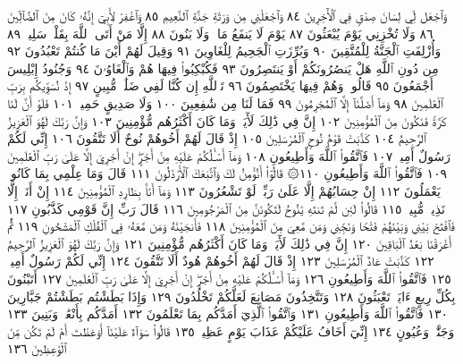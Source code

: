 وَٱجْعَل لِّي لِسَانَ صِدْقࣲ فِي ٱلْأٓخِرِينَ ٨٤ وَٱجْعَلْنِي مِن وَرَثَةِ جَنَّةِ
ٱلنَّعِيمِ ٨٥ وَٱغْفِرْ لِأَبِيٓ إِنَّهُۥ كَانَ مِنَ ٱلضَّآلِّينَ ٨٦ وَلَا تُخْزِنِي يَوْمَ
يُبْعَثُونَ ٨٧ يَوْمَ لَا يَنفَعُ مَالࣱ وَلَا بَنُونَ ٨٨ إِلَّا مَنْ أَتَى ٱللَّهَ بِقَلْبࣲ
سَلِيمࣲ ٨٩ وَأُزْلِفَتِ ٱلْجَنَّةُ لِلْمُتَّقِينَ ٩٠ وَبُرِّزَتِ ٱلْجَحِيمُ
لِلْغَاوِينَ ٩١ وَقِيلَ لَهُمْ أَيْنَ مَا كُنتُمْ تَعْبُدُونَ ٩٢ مِن دُونِ ٱللَّهِ هَلْ
يَنصُرُونَكُمْ أَوْ يَنتَصِرُونَ ٩٣ فَكُبْكِبُوا۟ فِيهَا هُمْ وَٱلْغَاوُۥنَ ٩٤ وَجُنُودُ
إِبْلِيسَ أَجْمَعُونَ ٩٥ قَالُوا۟ وَهُمْ فِيهَا يَخْتَصِمُونَ ٩٦ تَٱللَّهِ إِن كُنَّا لَفِي
ضَلَٰلࣲ مُّبِينٍ ٩٧ إِذْ نُسَوِّيكُم بِرَبِّ ٱلْعَٰلَمِينَ ٩٨ وَمَآ أَضَلَّنَآ إِلَّا
ٱلْمُجْرِمُونَ ٩٩ فَمَا لَنَا مِن شَٰفِعِينَ ١٠٠ وَلَا صَدِيقٍ حَمِيمࣲ ١٠١ فَلَوْ
أَنَّ لَنَا كَرَّةࣰ فَنَكُونَ مِنَ ٱلْمُؤْمِنِينَ ١٠٢ إِنَّ فِي ذَٰلِكَ لَأٓيَةࣰۖ وَمَا كَانَ
أَكْثَرُهُم مُّؤْمِنِينَ ١٠٣ وَإِنَّ رَبَّكَ لَهُوَ ٱلْعَزِيزُ ٱلرَّحِيمُ ١٠٤ كَذَّبَتْ
قَوْمُ نُوحٍ ٱلْمُرْسَلِينَ ١٠٥ إِذْ قَالَ لَهُمْ أَخُوهُمْ نُوحٌ أَلَا تَتَّقُونَ ١٠٦
إِنِّي لَكُمْ رَسُولٌ أَمِينࣱ ١٠٧ فَٱتَّقُوا۟ ٱللَّهَ وَأَطِيعُونِ ١٠٨ وَمَآ أَسْـَٔلُكُمْ
عَلَيْهِ مِنْ أَجْرٍۖ إِنْ أَجْرِيَ إِلَّا عَلَىٰ رَبِّ ٱلْعَٰلَمِينَ ١٠٩ فَٱتَّقُوا۟ ٱللَّهَ
وَأَطِيعُونِ ١١٠۞ قَالُوٓا۟ أَنُؤْمِنُ لَكَ وَٱتَّبَعَكَ ٱلْأَرْذَلُونَ ١١١
قَالَ وَمَا عِلْمِي بِمَا كَانُوا۟ يَعْمَلُونَ ١١٢ إِنْ حِسَابُهُمْ إِلَّا عَلَىٰ رَبِّيۖ
لَوْ تَشْعُرُونَ ١١٣ وَمَآ أَنَا۠ بِطَارِدِ ٱلْمُؤْمِنِينَ ١١٤ إِنْ أَنَا۠ إِلَّا نَذِيرࣱ
مُّبِينࣱ ١١٥ قَالُوا۟ لَئِن لَّمْ تَنتَهِ يَٰنُوحُ لَتَكُونَنَّ مِنَ ٱلْمَرْجُومِينَ ١١٦ قَالَ رَبِّ
إِنَّ قَوْمِي كَذَّبُونِ ١١٧ فَٱفْتَحْ بَيْنِي وَبَيْنَهُمْ فَتْحࣰا وَنَجِّنِي وَمَن مَّعِيَ
مِنَ ٱلْمُؤْمِنِينَ ١١٨ فَأَنجَيْنَٰهُ وَمَن مَّعَهُۥ فِي ٱلْفُلْكِ ٱلْمَشْحُونِ ١١٩
ثُمَّ أَغْرَقْنَا بَعْدُ ٱلْبَاقِينَ ١٢٠ إِنَّ فِي ذَٰلِكَ لَأٓيَةࣰۖ وَمَا كَانَ
أَكْثَرُهُم مُّؤْمِنِينَ ١٢١ وَإِنَّ رَبَّكَ لَهُوَ ٱلْعَزِيزُ ٱلرَّحِيمُ ١٢٢ كَذَّبَتْ
عَادٌ ٱلْمُرْسَلِينَ ١٢٣ إِذْ قَالَ لَهُمْ أَخُوهُمْ هُودٌ أَلَا تَتَّقُونَ ١٢٤ إِنِّي لَكُمْ
رَسُولٌ أَمِينࣱ ١٢٥ فَٱتَّقُوا۟ ٱللَّهَ وَأَطِيعُونِ ١٢٦ وَمَآ أَسْـَٔلُكُمْ عَلَيْهِ
مِنْ أَجْرٍۖ إِنْ أَجْرِيَ إِلَّا عَلَىٰ رَبِّ ٱلْعَٰلَمِينَ ١٢٧ أَتَبْنُونَ بِكُلِّ رِيعٍ
ءَايَةࣰ تَعْبَثُونَ ١٢٨ وَتَتَّخِذُونَ مَصَانِعَ لَعَلَّكُمْ تَخْلُدُونَ ١٢٩
وَإِذَا بَطَشْتُم بَطَشْتُمْ جَبَّارِينَ ١٣٠ فَٱتَّقُوا۟ ٱللَّهَ وَأَطِيعُونِ ١٣١
وَٱتَّقُوا۟ ٱلَّذِيٓ أَمَدَّكُم بِمَا تَعْلَمُونَ ١٣٢ أَمَدَّكُم بِأَنْعَٰمࣲ وَبَنِينَ ١٣٣
وَجَنَّٰتࣲ وَعُيُونٍ ١٣٤ إِنِّيٓ أَخَافُ عَلَيْكُمْ عَذَابَ يَوْمٍ عَظِيمࣲ ١٣٥
قَالُوا۟ سَوَآءٌ عَلَيْنَآ أَوَعَظْتَ أَمْ لَمْ تَكُن مِّنَ ٱلْوَٰعِظِينَ ١٣٦
